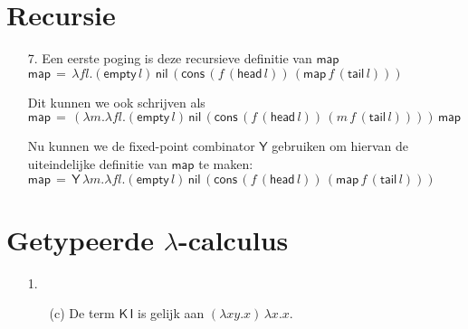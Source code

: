 \documentclass[a4paper,11pt]{article}
\begin{document}
\section{Recursie}


\begin{enumerate}


\item[7.]
Een eerste poging is deze recursieve definitie van $\textsf{map}$\\
$\textsf{map} \, = \, \lambda f l. (\textsf{empty} \, l) \, \textsf{nil} \,
(\textsf{cons} \, (f \, (\textsf{head} \, l)) \, (\textsf{map} \, f \, (\textsf{tail} \, l)))$

Dit kunnen we ook schrijven als\\
$\textsf{map} \, = \, (\lambda m. \lambda f l. (\textsf{empty} \, l) \, \textsf{nil} \,
(\textsf{cons} \, (f \, (\textsf{head} \, l)) \, (m \, f \, (\textsf{tail} \, l)))) \, \textsf{map}$

Nu kunnen we de fixed-point combinator $\textsf{Y}$ gebruiken om hiervan de
uiteindelijke definitie van $\textsf{map}$ te maken:\\
$\textsf{map} \, = \, \textsf{Y} \, \lambda m. \lambda f l. (\textsf{empty} \, l) \, \textsf{nil} \,
(\textsf{cons} \, (f \, (\textsf{head} \, l)) \, (\textsf{map} \, f \, (\textsf{tail} \, l)))$


\end{enumerate}


\section{Getypeerde $\lambda$-calculus}


\begin{enumerate}


\item[1.]

\begin{enumerate}

\item[(c)]
De term $\textsf{K} \, \textsf{I}$ is gelijk aan $(\lambda x y. x) \, \lambda x. x$.
\begin{prooftree}
\end{prooftree}

\end{enumerate}


\end{enumerate}
\end{document}
